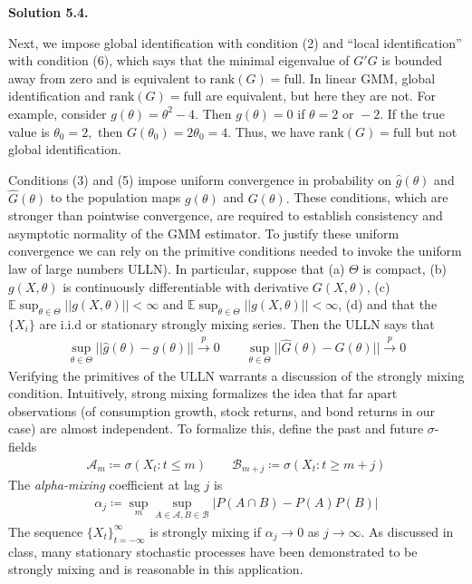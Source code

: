 \documentclass[11pt]{article}
\newenvironment{solution}[1]
    {\bigskip\noindent\textbf{Solution #1.} \par}
    {\medskip}
\newcommand{\ev}{\mathbb{E}}
\begin{document}
\begin{solution}{5.4}
Next, we impose global identification with condition (2) and ``local identification'' with condition (6), which says that the minimal eigenvalue of $G'G$ is bounded away from zero and is equivalent to $\text{rank}(G) = \text{full}.$ In linear GMM, global identification and $\text{rank}(G) = \text{full}$ are equivalent, but here they are not.  For example, consider $g(\theta) = \theta^2 - 4.$ Then $g(\theta) = 0$ if $\theta = 2 \text{ or } -2.$ If the true value is $\theta_0 = 2,$ then $G(\theta_0) = 2\theta_0 = 4.$ Thus, we have $\text{rank}(G) = \text{full}$ but not global identification.  

Conditions (3) and (5) impose uniform convergence in probability on $\hat{g}(\theta)$ and $\hat{G}(\theta)$ to the population maps $g(\theta)$ and $G(\theta).$ These conditions, which are stronger than pointwise convergence, are required to establish consistency and asymptotic normality of the GMM estimator. To justify these uniform convergence we can rely on the primitive conditions needed to invoke the uniform law of large numbers ULLN). In particular, suppose that (a) $\Theta$ is compact, (b) $g(X,\theta)$ is continuously differentiable with derivative $G(X,\theta)$, (c) $\ev\sup_{\theta\in\Theta}||g(X,\theta)|| < \infty$ and  $\ev\sup_{\theta\in\Theta}||g(X,\theta)|| < \infty$, (d) and that the $\{X_i\}$ are i.i.d or stationary strongly mixing series. Then the ULLN says that 
\begin{align*}
    \sup_{\theta \in \Theta} || \hat{g}(\theta) - g(\theta) || \xrightarrow{p} 0 
    \qquad 
    \sup_{\theta \in \Theta} || \hat{G}(\theta) - G(\theta) || \xrightarrow{p} 0 
\end{align*}
Verifying the primitives of the ULLN warrants a discussion of the strongly mixing condition. Intuitively, strong mixing formalizes the idea that far apart observations (of consumption growth, stock returns, and bond returns in our case) are almost independent. To formalize this, define the past and future $\sigma$-fields
\begin{align*}
    \mathcal{A}_m \coloneq \sigma(X_t: t \leq m) \qquad \mathcal{B}_{m+j} \coloneq \sigma(X_t: t\geq m+j)
\end{align*}
The \textit{alpha-mixing} coefficient at lag $j$ is 
\begin{align*}
    \alpha_j \coloneq \sup_m \sup_{A \in\mathcal{A}, B \in \mathcal{B}} |P(A \cap B) - P(A)P(B)|
\end{align*}
The sequence $\{X_t\}_{t=-\infty}^{\infty}$ is strongly mixing if $\alpha_j \to 0$ as $j \to \infty.$ As discussed in class, many stationary stochastic processes have been demonstrated to be strongly mixing and is reasonable in this application. 


\end{solution}
\end{document}
